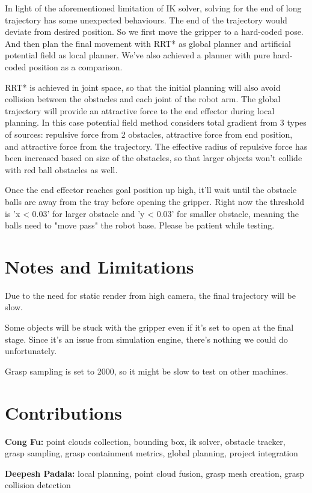 \documentclass[
	english,
	accentcolor=11d,%
	type=intern,
	marginpar=false,
    logofile=media/PEARLTUDA.png
	]{tudapub}
\begin{document}
In light of the aforementioned limitation of IK solver, solving for the end of long trajectory has some unexpected behaviours. The end of the trajectory would deviate from desired position. So we first move the gripper to a hard-coded pose. And then plan the final movement with RRT* as global planner and artificial potential field as local planner. We've also achieved a planner with pure hard-coded position as a comparison.

RRT* is achieved in joint space, so that the initial planning will also avoid collision between the obstacles and each joint of the robot arm. The global trajectory will provide an attractive force to the end effector during local planning. In this case potential field method considers total gradient from 3 types of sources: repulsive force from 2 obstacles, attractive force from end position, and attractive force from the trajectory. The effective radius of repulsive force has been increased based on size of the obstacles, so that larger objects won't collide with red ball obstacles as well.

Once the end effector reaches goal position up high, it'll wait until the obstacle balls are away from the tray before opening the gripper. Right now the threshold is 'x < 0.03' for larger obstacle and 'y < 0.03' for smaller obstacle, meaning the balls need to "move pass" the robot base. Please be patient while testing. 

\section{Notes and Limitations}

Due to the need for static render from high camera, the final trajectory will be slow. 

Some objects will be stuck with the gripper even if it's set to open at the final stage. Since it's an issue from simulation engine, there's nothing we could do unfortunately.

Grasp sampling is set to 2000, so it might be slow to test on other machines.

\section{Contributions}

\noindent\textbf{Cong Fu:} point clouds collection, bounding box, ik solver, obstacle tracker, grasp sampling, grasp containment metrics, global planning, project integration

\noindent\textbf{Deepesh Padala:} local planning, point cloud fusion, grasp mesh creation, grasp collision detection
\end{document}
